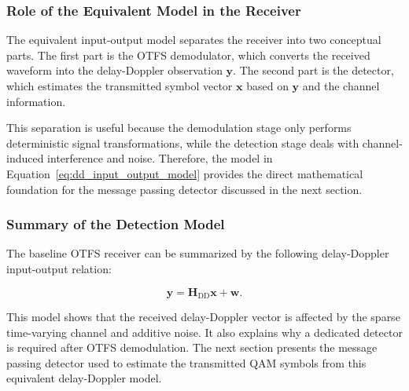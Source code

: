 \subsubsection{Role of the Equivalent Model in the Receiver}

The equivalent input-output model separates the receiver into two conceptual parts. The first part is the OTFS demodulator, which converts the received waveform into the delay-Doppler observation \(\mathbf{y}\). The second part is the detector, which estimates the transmitted symbol vector \(\mathbf{x}\) based on \(\mathbf{y}\) and the channel information.

This separation is useful because the demodulation stage only performs deterministic signal transformations, while the detection stage deals with channel-induced interference and noise. Therefore, the model in Equation~\eqref{eq:dd_input_output_model} provides the direct mathematical foundation for the message passing detector discussed in the next section.

\subsubsection{Summary of the Detection Model}

The baseline OTFS receiver can be summarized by the following delay-Doppler input-output relation:

\begin{equation}
    \mathbf{y}
    =
    \mathbf{H}_{\mathrm{DD}}\mathbf{x}
    +
    \mathbf{w}.
\end{equation}

This model shows that the received delay-Doppler vector is affected by the sparse time-varying channel and additive noise. It also explains why a dedicated detector is required after OTFS demodulation. The next section presents the message passing detector used to estimate the transmitted QAM symbols from this equivalent delay-Doppler model.
